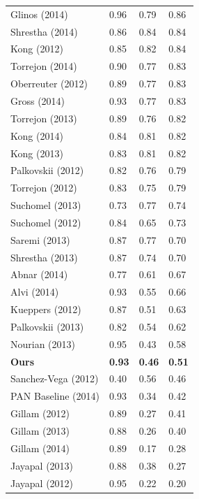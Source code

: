 \begin{table}[th]
\begin{tabularx}{.31\textwidth}{@{}l*{3}{X}}
Glinos (2014)       &      0.96 &   0.79 &    0.86 \\
Shrestha (2014)     &      0.86 &   0.84 &    0.84 \\
Kong (2012)         &      0.85 &   0.82 &    0.84 \\
Torrejon (2014)     &      0.90 &   0.77 &    0.83 \\
Oberreuter (2012)   &      0.89 &   0.77 &    0.83 \\ %
Gross (2014)        &      0.93 &   0.77 &    0.83 \\
Torrejon (2013)     &      0.89 &   0.76 &    0.82 \\ %
Kong (2014)         &      0.84 &   0.81 &    0.82 \\ %
Kong (2013)         &      0.83 &   0.81 &    0.82 \\ %
Palkovskii (2012)   &      0.82 &   0.76 &    0.79 \\ %
Torrejon (2012)     &      0.83 &   0.75 &    0.79 \\ %
Suchomel (2013)     &      0.73 &   0.77 &    0.74 \\
Suchomel (2012)     &      0.84 &   0.65 &    0.73 \\ %
Saremi (2013)       &      0.87 &   0.77 &    0.70 \\
Shrestha (2013)     &      0.87 &   0.74 &    0.70 \\ %
Abnar (2014)        &      0.77 &   0.61 &    0.67 \\
Alvi (2014)         &      0.93 &   0.55 &    0.66 \\
Kueppers (2012)     &      0.87 &   0.51 &    0.63 \\
Palkovskii (2013)   &      0.82 &   0.54 &    0.62 \\ %
Nourian (2013)      &      0.95 &   0.43 &    0.58 \\
\textbf{Ours}       &      \textbf{0.93} &   \textbf{0.46} &    \textbf{0.51} \\
Sanchez-Vega (2012) &      0.40 &   0.56 &    0.46 \\
PAN Baseline (2014) &      0.93 &   0.34 &    0.42 \\
Gillam  (2012)      &      0.89 &   0.27 &    0.41 \\
Gillam  (2013)      &      0.88 &   0.26 &    0.40 \\ %
Gillam  (2014)      &      0.89 &   0.17 &    0.28 \\ %
Jayapal (2013)      &      0.88 &   0.38 &    0.27 \\
Jayapal (2012)      &      0.95 &   0.22 &    0.20 \\ %
\bottomrule
\end{tabularx}

\end{table}
